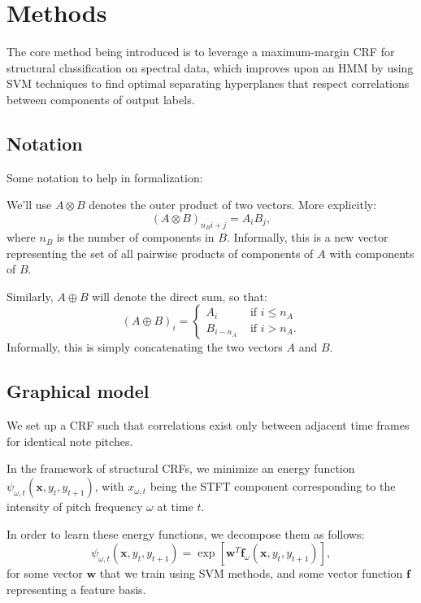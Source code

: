 \documentclass{article}
\begin{document}
\section{Methods}
\newcommand{\x}{\mathbf{x}}
\newcommand{\y}{\mathbf{y}}
\newcommand{\w}{\mathbf{w}}
\newcommand{\f}{\mathbf{f}}
\newcommand{\ttt}{\mathbf{t}}

The core method being introduced is to leverage a
maximum-margin CRF \cite{Taskar03max-marginmarkov} for
structural classification on spectral data, which improves
upon an HMM by using SVM techniques to find optimal separating hyperplanes
that respect correlations between components of output labels.


\subsection{Notation}
Some notation to help in formalization:

We'll use $A \otimes B$ denotes the outer product of two vectors. More
explicitly:
\[ (A \otimes B)_{n_Bi+j} = A_iB_j, \]
where $n_B$ is the number of components in $B$. Informally, this is
a new vector representing the set of all pairwise products of components of
$A$ with components of $B$.

Similarly, $A \oplus B$ will denote the direct sum, so that:
\[ (A \oplus B)_i =
      \begin{cases} A_i & \text{ if $i \le n_A$} \\
                    B_{i-n_A} & \text{ if $i > n_A$}.
      \end{cases}
\]
Informally, this is simply concatenating the two vectors $A$ and $B$.

\subsection{Graphical model}
We set up a CRF such that correlations exist only between adjacent time
frames for identical note pitches.

In the framework of structural CRFs, we minimize
an energy function $\psi_{\omega,t}(\x,y_t,y_{t+1})$,
with $x_{\omega,t}$ being the STFT component corresponding to the intensity
of pitch frequency $\omega$ at time $t$. 

In order to learn these energy functions, we decompose them as follows:
\[ \psi_{\omega,t}(\x,y_t,y_{t+1}) = \exp[\w^T\f_{\omega}(\x,y_t,y_{t+1})], \]
for some vector $\w$ that we train using SVM methods, and some vector
function $\f$ representing a feature basis.
\end{document}
